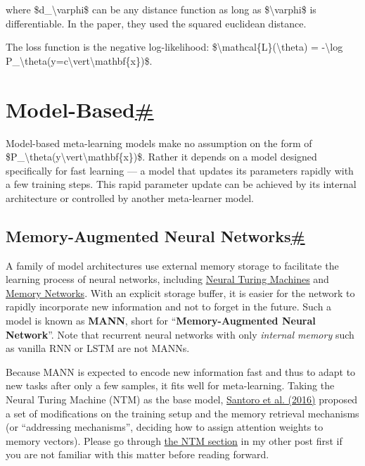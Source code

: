 where \$d\_\textbackslash varphi\$ can be any distance function as long as \$\textbackslash varphi\$ is differentiable. In the paper, they used the squared euclidean distance.

The loss function is the negative log-likelihood: \$\textbackslash mathcal\{L\}(\textbackslash theta) = -\textbackslash log P\_\textbackslash theta(y=c\textbackslash vert\textbackslash mathbf\{x\})\$.

\section{\texorpdfstring{Model-Based\hyperref[model-based]{\#}}{Model-Based\#}}\label{model-based}

Model-based meta-learning models make no assumption on the form of \$P\_\textbackslash theta(y\textbackslash vert\textbackslash mathbf\{x\})\$. Rather it depends on a model designed specifically for fast learning --- a model that updates its parameters rapidly with a few training steps. This rapid parameter update can be achieved by its internal architecture or controlled by another meta-learner model.

\subsection{\texorpdfstring{Memory-Augmented Neural Networks\hyperref[memory-augmented-neural-networks]{\#}}{Memory-Augmented Neural Networks\#}}\label{memory-augmented-neural-networks}

A family of model architectures use external memory storage to facilitate the learning process of neural networks, including \href{https://lilianweng.github.io/posts/2018-06-24-attention/\#neural-turing-machines}{Neural Turing Machines} and \href{https://arxiv.org/abs/1410.3916}{Memory Networks}. With an explicit storage buffer, it is easier for the network to rapidly incorporate new information and not to forget in the future. Such a model is known as \textbf{MANN}, short for ``\textbf{Memory-Augmented Neural Network}''. Note that recurrent neural networks with only \emph{internal memory} such as vanilla RNN or LSTM are not MANNs.

Because MANN is expected to encode new information fast and thus to adapt to new tasks after only a few samples, it fits well for meta-learning. Taking the Neural Turing Machine (NTM) as the base model, \href{http://proceedings.mlr.press/v48/santoro16.pdf}{Santoro et al. (2016)} proposed a set of modifications on the training setup and the memory retrieval mechanisms (or ``addressing mechanisms'', deciding how to assign attention weights to memory vectors). Please go through \href{https://lilianweng.github.io/posts/2018-06-24-attention/\#neural-turing-machines}{the NTM section} in my other post first if you are not familiar with this matter before reading forward.

